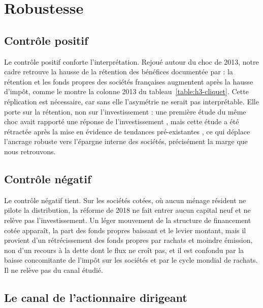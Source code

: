 \section{Robustesse}\label{sec:robustesse}

\subsection{Contrôle positif}

Le contrôle positif conforte l'interprétation. Rejoué autour du choc de 2013, notre cadre retrouve
la hausse de la rétention des bénéfices documentée par \citet{bach2023} : la rétention et les fonds
propres des sociétés françaises augmentent après la hausse d'impôt, comme le montre la colonne 2013
du tableau~\ref{table:h3-cliquet}. Cette réplication est nécessaire, car sans elle l'asymétrie ne
serait pas interprétable. Elle porte sur la rétention, non sur l'investissement : une première étude
du même choc avait rapporté une réponse de l'investissement \citep{boissel2022}, mais cette étude a
été rétractée après la mise en évidence de tendances pré-existantes \citep{bachcomment2023}, ce qui
déplace l'ancrage robuste vers l'épargne interne des sociétés, précisément la marge que nous
retrouvons.

\subsection{Contrôle négatif}

Le contrôle négatif tient. Sur les sociétés cotées, où aucun ménage résident ne pilote la
distribution, la réforme de 2018 ne fait entrer aucun capital neuf et ne relève pas
l'investissement. Un léger mouvement de la structure de financement cotée apparaît, la part des
fonds propres baissant et le levier montant, mais il provient d'un rétrécissement des fonds propres
par rachats et moindre émission, non d'un recours à la dette dont le flux ne croît pas, et il est
confondu par la baisse concomitante de l'impôt sur les sociétés et par le cycle mondial de rachats.
Il ne relève pas du canal étudié.

\subsection{Le canal de l'actionnaire dirigeant}

